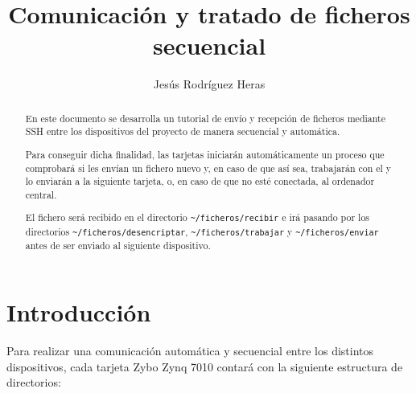 \documentclass[12pt,letterpaper]{article}
\title{Comunicación y tratado de ficheros secuencial}
\author{Jesús Rodríguez Heras}
\begin{document}
	
	\maketitle
	\begin{abstract} %
		\begin{center}
			En este documento se desarrolla un tutorial de envío y recepción de ficheros mediante SSH entre los dispositivos del proyecto de manera secuencial y automática.
			
			Para conseguir dicha finalidad, las tarjetas iniciarán automáticamente un proceso que comprobará si les envían un fichero nuevo y, en caso de que así sea, trabajarán con el y lo enviarán a la siguiente tarjeta, o, en caso de que no esté conectada, al ordenador central.
			
			El fichero será recibido en el directorio \texttt{\textasciitilde/ficheros/recibir} e irá pasando por los directorios \texttt{\textasciitilde/ficheros/desencriptar}, \texttt{\textasciitilde/ficheros/trabajar} y \texttt{\textasciitilde/ficheros/enviar} antes de ser enviado al siguiente dispositivo.
		\end{center}
	\end{abstract}
	\thispagestyle{empty}
	\newpage
	
	\tableofcontents
	\newpage
	
	
	
	
	\lstset{language=bash, numbers=left, numberstyle=\tiny, numbersep=10pt, firstnumber=1, stepnumber=1, basicstyle=\small\ttfamily, tabsize=2, extendedchars=true, inputencoding=utf8/latin1, breaklines=true}
	

\section{Introducción}
Para realizar una comunicación automática y secuencial entre los distintos dispositivos, cada tarjeta Zybo Zynq 7010 contará con la siguiente estructura de directorios:\\
\end{document}
